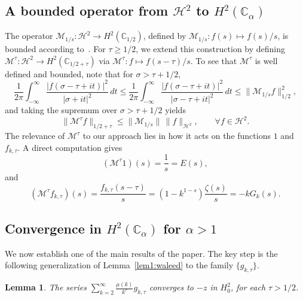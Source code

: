 \documentclass[11pt]{extarticle}
\numberwithin{equation}{section}
\theoremstyle{plain}
\newtheorem{lemma}[theorem]{Lemma}
\theoremstyle{remark}
\begin{document}
\subsection{A bounded operator from $\mathcal{H}^2$ to $H^2(\mathbb{C}_\alpha)$}

The operator $\mathcal{M}_{1/s} : \mathcal{H}^2 \to H^2(\mathbb{C}_{1/2})$, defined by 
$\mathcal{M}_{1/s} : f(s) \mapsto f(s)/s$, is bounded according to~\cite{6}. 
For $\tau \geq 1/2$, we extend this construction by defining 
$\mathcal{M}^\tau : \mathcal{H}^2 \to H^2(\mathbb{C}_{1/2+\tau})$ via $\mathcal{M}^\tau : f \longmapsto f(s - \tau)/s$. 
To see that $\mathcal{M}^\tau$ is well defined and bounded, note that for $\sigma > \tau + 1/2$,
\[
\frac{1}{2\pi}\int_{-\infty}^{\infty}\frac{|f(\sigma-\tau+it)|^2}{|\sigma+it|^2}\,dt
\leq \frac{1}{2\pi}\int_{-\infty}^{\infty}\frac{|f(\sigma-\tau+it)|^2}{|\sigma-\tau+it|^2}\,dt
\leq \|\mathcal{M}_{1/s}f\|^2_{1/2},
\]
and taking the supremum over $\sigma > \tau + 1/2$ yields
\[
\|\mathcal{M}^\tau f\|_{1/2+\tau} \leq \|\mathcal{M}_{1/s}\|\,\|f\|_{\mathcal{H}^2},
\qquad \forall f \in \mathcal{H}^2.
\]
The relevance of $\mathcal{M}^\tau$ to our approach lies in how it acts on the 
functions $1$ and $f_{k,\tau}$. A direct computation gives
\[
(\mathcal{M}^\tau 1)(s) = \frac{1}{s} = E(s),
\]
and
\[
(\mathcal{M}^\tau f_{k,\tau})(s) = \frac{f_{k,\tau}(s-\tau)}{s} 
= (1-k^{1-s})\frac{\zeta(s)}{s} = -kG_k(s).
\]

\subsection{Convergence in $H^2(\mathbb{C}_\alpha)$ for $\alpha > 1$}

We now establish one of the main results of the paper. The key step is the following 
generalization of Lemma~\ref{lem1:waleed} to the family $\{g_{k,\tau}\}$.

\begin{lemma}\label{lem:main}
The series $\sum_{k=2}^{\infty} \frac{\mu(k)}{k^\tau} g_{k,\tau}$ converges 
to $-z$ in $H^2_0$, for each $\tau > 1/2$.
\end{lemma}
\end{document}
